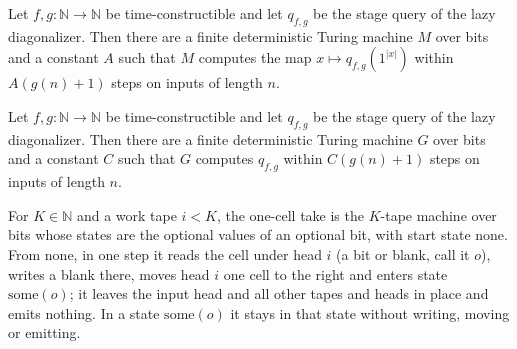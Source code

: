\begin{theorem}
\label{Turing.NTimeDiag.qy_main}
\leanok
{}
Let $f, g : \mathbb{N} \to \mathbb{N}$ be time-constructible and let $q_{f,g}$ be the stage query
of the lazy diagonalizer. Then there are a finite deterministic Turing machine $M$ over bits and a
constant $A$ such that $M$ computes the map $x \mapsto q_{f,g}(1^{|x|})$ within $A(g(n) + 1)$ steps
on inputs of length $n$.
\end{theorem}

\begin{theorem}
\label{Turing.NTimeDiag.exists_queryTM}
\leanok
{}
Let $f, g : \mathbb{N} \to \mathbb{N}$ be time-constructible and let $q_{f,g}$ be the stage query
of the lazy diagonalizer. Then there are a finite deterministic Turing machine $G$ over bits and a
constant $C$ such that $G$ computes $q_{f,g}$ within $C(g(n) + 1)$ steps on inputs of length $n$.
\end{theorem}

\begin{definition}
\label{Turing.NTimeDiag.dzTakeTM}
\leanok
{}
For $K \in \mathbb{N}$ and a work tape $i < K$, the one-cell take is the $K$-tape machine over bits
whose states are the optional values of an optional bit, with start state $\mathrm{none}$. From
$\mathrm{none}$, in one step it reads the cell under head $i$ (a bit or blank, call it $o$), writes
a blank there, moves head $i$ one cell to the right and enters state $\mathrm{some}(o)$; it leaves
the input head and all other tapes and heads in place and emits nothing. In a state
$\mathrm{some}(o)$ it stays in that state without writing, moving or emitting.
\end{definition}


